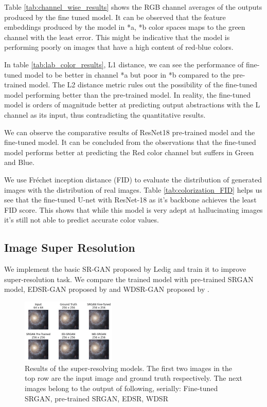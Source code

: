 \documentclass[conference]{IEEEtran}
\begin{document}


Table \ref{tab:channel_wise_results} shows the RGB channel averages of the outputs produced by the fine tuned model. It can be observed that the feature embeddings produced by the model in *a, *b color spaces maps to the green channel with the least error. This might be indicative that the model is performing poorly on images that have a high content of red-blue colors. 

 
In table \ref{tab:lab_color_results}, L1 distance, we can see the performance of fine-tuned model to be better in channel *a but poor in *b compared to the pre-trained model. The L2 distance metric rules out the possibility of the fine-tuned model performing better than the pre-trained model. In reality, the fine-tuned model is orders of magnitude better at predicting output abstractions with the L channel as its input, thus contradicting the quantitative results.


We can observe the comparative results of ResNet18 pre-trained model and the fine-tuned model. It can be concluded from the observations that the fine-tuned model performs better at predicting the Red color channel but suffers in Green and Blue.


We use Fréchet inception distance (FID) to evaluate the distribution of generated images with the distribution of real images. Table \ref{tab:colorization_FID} helps us see that the fine-tuned U-net with ResNet-18 as it's backbone achieves the least FID score. This shows that while this model is very adept at hallucinating images it's still not able to predict accurate color values. 

\subsection{Image Super Resolution}
\hspace*{0.25 in}We implement the basic SR-GAN proposed by Ledig and train it to improve super-resolution task. We compare the trained model with pre-trained SRGAN model, EDSR-GAN proposed by \cite{lim2017enhanced} and WDSR-GAN proposed by \cite{yu2018wide}.

\begin{figure}[!htb]
	\includegraphics[width=0.4\textwidth]{figures/comparison_upscale}
	\caption{Results of the super-resolving models. The first two images in the top row are the input image and ground truth respectively. The next images belong to the output of following, serially: Fine-tuned SRGAN, pre-trained SRGAN, EDSR, WDSR}
	\label{fig: sr_results}
\end{figure}
\end{document}
